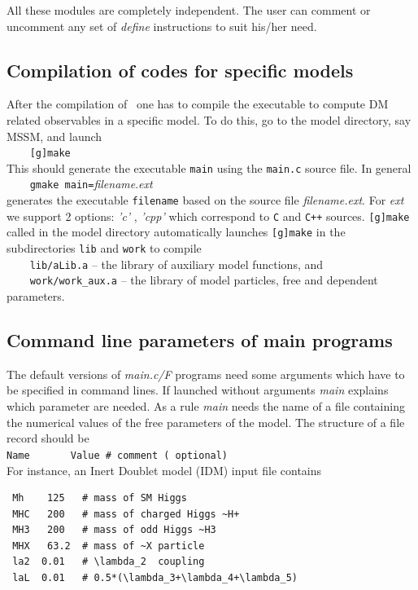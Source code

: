 \documentclass[12pt,a4paper]{article}
\begin{document}
All these modules are completely independent. The user can comment or
uncomment any set of {\it define} instructions to suit his/her need. 



\subsection{Compilation of codes for specific models}
 After the compilation of \micro\ one has to compile
the executable to compute DM related observables in a specific model. To
do this, go to the model directory, say MSSM,  and launch\\[2mm]
\verb|    [g]make|\\[2mm]
This should generate the executable {\tt main} using the {\tt main.c} source file. In
general\\[2mm]
\verb|    gmake main=|{\it filename}.{\it ext}\\[2mm]
generates the executable {\tt filename}  based on the source file {\it
filename.ext}.
For {\it ext}  we support 2 options: {\it 'c'} ,  {\it 'cpp'} which correspond to
{\tt C}  and {\tt C++} sources.
{\tt [g]make} called  in the model directory automatically  launches {\tt [g]make}
in the subdirectories {\tt lib} and {\tt work} to compile \\[2mm]
 \verb|    lib/aLib.a|   -- the library of auxiliary model functions, and \\
 \verb|    work/work_aux.a| -- the library of model particles, free and dependent parameters.\\
 

\subsection{Command line parameters of main programs}
\label{sec:command}
The default versions of {\it main.c/F}  programs need some arguments
which have to be specified in command lines. If launched without
arguments {\it main} explains which parameter are needed. 
As a rule  {\it main}  needs  the name of a file containing the
numerical values of the free parameters of the model. The structure of a file
record should be\\
\verb|Name       Value # comment ( optional)|\\

\noindent
For instance, an Inert Doublet model (IDM) input file contains
\begin{verbatim}
 Mh    125   # mass of SM Higgs 
 MHC   200   # mass of charged Higgs ~H+
 MH3   200   # mass of odd Higgs ~H3
 MHX   63.2  # mass of ~X particle
 la2  0.01   # \lambda_2  coupling
 laL  0.01   # 0.5*(\lambda_3+\lambda_4+\lambda_5)
\end{verbatim}
\end{document}
